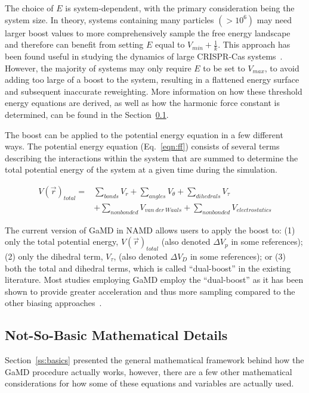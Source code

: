 \documentclass[9pt,tutorial]{livecoms}
\begin{document}
\bigskip

The choice of $E$ is system-dependent, with the primary consideration being the system size. In theory, systems containing many particles $\left(> 10^{6}\right)$ may need larger boost values to more comprehensively sample the free energy landscape and therefore can benefit from setting $E$ equal to $V_{min} + \frac{1}{k}$. This approach has been found useful in studying the dynamics of large CRISPR-Cas systems~\cite{wang_gaussian_2021}. However, the majority of systems may only require $E$ to be set to $V_{max}$, to avoid adding too large of a boost to the system, resulting in a flattened energy surface and subsequent inaccurate reweighting. More information on how these threshold energy equations are derived, as well as how the harmonic force constant is determined, can be found in the Section~\ref{ss:notsobasics}. 

The boost can be applied to the potential energy equation in a few different ways. The potential energy equation (Eq.~\ref{eqn:ff}) consists of several terms describing the interactions within the system that are summed to determine the total potential energy of the system at a given time during the simulation.

\begin{equation}  
    \begin{aligned}
    V\left(\vec{r}\right)_{total} =
    & \sum\limits_{bonds} V_{r} + \sum\limits_{angles} V_{\theta} + \sum\limits_{dihedrals} V_{\tau} \\
    & + \sum\limits_{nonbonded} V_{van~der~Waals} + 
    \sum\limits_{nonbonded} V_{electrostatics}
    \end{aligned}
    \label{eqn:ff}
\end{equation}

\bigskip

The current version of GaMD in NAMD allows users to apply the boost to: (1) only the total potential energy, $V\left(\vec{r}\right)_{total}$ (also denoted $\Delta{V_{p}}$ in some references); (2) only the dihedral term, $V_{\tau}$, (also denoted $\Delta{V_{D}}$ in some references); or (3) both the total and dihedral terms, which is called ``dual-boost'' in the existing literature. Most studies employing GaMD employ the ``dual-boost'' as it has been shown to provide greater acceleration and thus more sampling compared to the other biasing approaches~\cite{hamelberg_sampling_2007}.

\subsection{Not-So-Basic Mathematical Details} \label{ss:notsobasics}
Section~\ref{ss:basics} presented the general mathematical framework behind how the GaMD procedure actually works, however, there are a few other mathematical considerations for how some of these equations and variables are actually used. 
\end{document}
